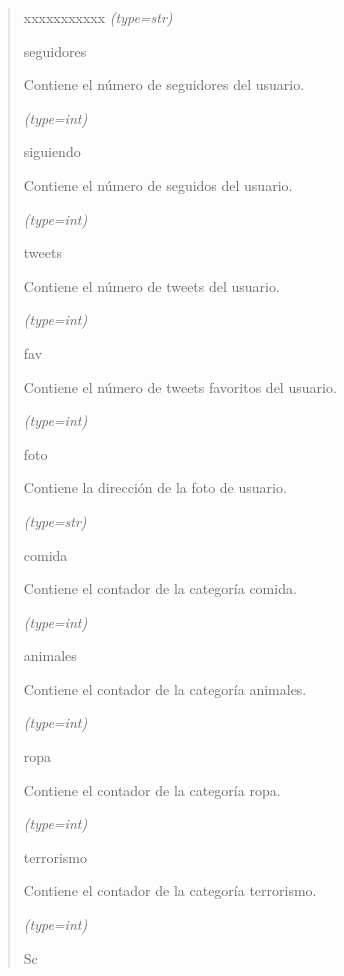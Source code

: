 \begin{boxedminipage}{\funcwidth}
\begin{quote}
\begin{Ventry}{xxxxxxxxxxx}
            {\it (type=str)}

          \item[seguidores]

          Contiene el número de seguidores del usuario.

            {\it (type=int)}

          \item[siguiendo]

          Contiene el número de seguidos del usuario.

            {\it (type=int)}

          \item[tweets]

          Contiene el número de tweets del usuario.

            {\it (type=int)}

          \item[fav]

          Contiene el número de tweets favoritos del usuario.

            {\it (type=int)}

          \item[foto]

          Contiene la dirección de la foto de usuario.

            {\it (type=str)}

          \item[comida]

          Contiene el contador de la categoría comida.

            {\it (type=int)}

          \item[animales]

          Contiene el contador de la categoría animales.

            {\it (type=int)}

          \item[ropa]

          Contiene el contador de la categoría ropa.

            {\it (type=int)}

          \item[terrorismo]

          Contiene el contador de la categoría terrorismo.

            {\it (type=int)}

          \item[Sc]


\end{Ventry}
\end{quote}
\end{boxedminipage}
